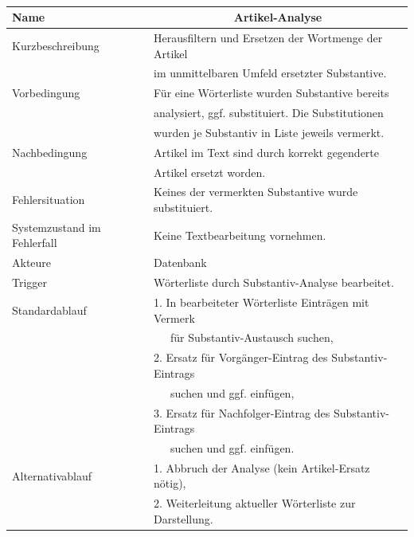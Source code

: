 \documentclass[paper=a4, parskip=half]{scrreprt}
\begin{document}
\newpage
 
\newpage
 
\newpage

\begin{table}[hbt!]
\begin{tabular}{|l|l|}
\hline
Name                        & \multicolumn{1}{c|}{\textbf{Artikel-Analyse}} \\ \hline
Kurzbeschreibung            & Herausfiltern und Ersetzen der Wortmenge der Artikel \\
                            & im unmittelbaren Umfeld ersetzter Substantive. \\ \hline
Vorbedingung                & Für eine Wörterliste wurden Substantive bereits \\
                            & analysiert, ggf. substituiert. Die Substitutionen \\
                            & wurden je Substantiv in Liste jeweils vermerkt. \\ \hline
Nachbedingung               & Artikel im Text sind durch korrekt gegenderte \\
                            & Artikel ersetzt worden. \\ \hline
Fehlersituation             & Keines der vermerkten Substantive wurde substituiert. \\ \hline
Systemzustand im Fehlerfall & Keine Textbearbeitung vornehmen. \\ \hline
Akteure                     & Datenbank \\ \hline
Trigger                     & Wörterliste durch Substantiv-Analyse bearbeitet. \\ \hline
Standardablauf              & 1. In bearbeiteter Wörterliste Einträgen mit Vermerk \\
                            &    für Substantiv-Austausch suchen, \\
                            & 2. Ersatz für Vorgänger-Eintrag des Substantiv-Eintrags\\
                            &    suchen und ggf. einfügen, \\
                            & 3. Ersatz für Nachfolger-Eintrag des Substantiv-Eintrags\\
                            &    suchen und ggf. einfügen. \\ \hline
Alternativablauf            & 1. Abbruch der Analyse (kein Artikel-Ersatz nötig), \\
                            & 2. Weiterleitung aktueller Wörterliste zur Darstellung. \\ \hline

\end{tabular}
\end{table}
\end{document}
